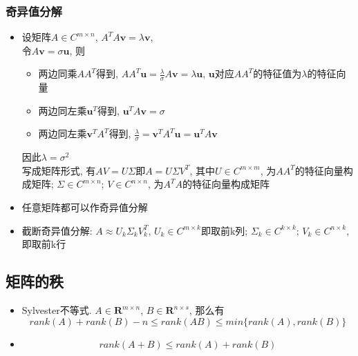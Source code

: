 \documentclass[UTF8]{article}
\begin{document}
\subsubsection{奇异值分解}
\begin{itemize}
\item 设矩阵$A\in C^{m\times n}$, $A^TA\bm{v}=\lambda\bm{v}$, \\
	令$A\bm{v}=\sigma\bm{u}$, 则
	\begin{itemize}
	\item 两边同乘$AA^T$得到, $AA^T\bm{u}=\frac{\lambda}{\sigma}A\bm{v}=\lambda\bm{u}$, $\bm{u}$对应$AA^T$的特征值为$\lambda$的特征向量
	\item 两边同左乘$\bm{u}^T$得到, $\bm{u}^TA\bm{v}=\sigma$
	\item 两边同左乘$\bm{v}^TA^T$得到, $\frac{\lambda}{\sigma}=\bm{v}^TA^T\bm{u}=\bm{u}^TA\bm{v}$
	\end{itemize}
	因此$\lambda=\sigma^2$\\
	写成矩阵形式, 有$AV=U\Sigma$即$A=U\Sigma V^T$, 其中$U\in C^{m\times m}$, 为$AA^T$的特征向量构成矩阵; $\Sigma\in C^{m\times n}$; $V\in C^{n\times n}$, 为$A^TA$的特征向量构成矩阵
\item 任意矩阵都可以作奇异值分解
\item 截断奇异值分解: $A\approx U_k\Sigma_kV_k^T$, $U_k\in C^{m\times k}$即取前k列; $\Sigma_k\in C^{k\times k}$; $V_k\in C^{n\times k}$, 即取前k行
\end{itemize}

\subsection{矩阵的秩}
\begin{itemize}
\item Sylvester不等式. $A\in\mathbf{R}^{m\times n}$, $B\in\mathbf{R}^{n\times s}$, 那么有
	$$rank(A)+rank(B)-n\le rank(AB)\le min\{rank(A), rank(B)\}$$
\item $$rank(A+B)\le rank(A)+rank(B)$$
\end{itemize}
\end{document}
